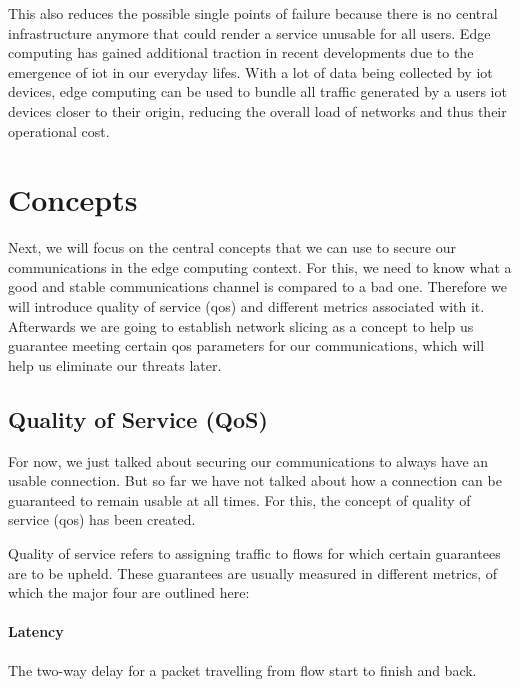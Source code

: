 This also reduces the possible single points of failure because there is no central infrastructure anymore that could render a service unusable for all users. Edge computing has gained additional traction in recent developments due to the emergence of \acrshort{iot} in our everyday lifes. With a lot of data being collected by \acrshort{iot} devices, edge computing can be used to bundle all traffic generated by a users \acrshort{iot} devices closer to their origin, reducing the overall load of networks and thus their operational cost.


\section{Concepts}
\label{bg_concepts}
Next, we will focus on the central concepts that we can use to secure our communications in the edge computing context. For this, we need to know what a good and stable communications channel is compared to a bad one. Therefore we will introduce quality of service (\acrshort{qos}) and different metrics associated with it. Afterwards we are going to establish network slicing as a concept to help us guarantee meeting certain \acrshort{qos} parameters for our communications, which will help us eliminate our threats later.

\subsection{Quality of Service (QoS)}
For now, we just talked about securing our communications to always have an usable connection. But so far we have not talked about how a connection can be guaranteed to remain usable at all times. For this, the concept of quality of service (\acrshort{qos}) has been created.

Quality of service \cite{qos, rfc791} refers to assigning traffic to flows for which certain guarantees are to be upheld. These guarantees are usually measured in different metrics, of which the major four are outlined here:

\paragraph{Latency} The two-way delay for a packet travelling from flow start to finish and back.


